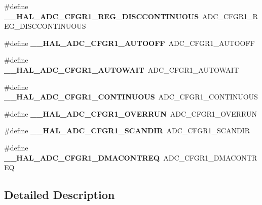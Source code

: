 \begin{DoxyCompactItemize}
\#define {\bfseries \+\_\+\+\_\+\+H\+A\+L\+\_\+\+A\+D\+C\+\_\+\+C\+F\+G\+R1\+\_\+\+R\+E\+G\+\_\+\+D\+I\+S\+C\+C\+O\+N\+T\+I\+N\+U\+O\+US}~A\+D\+C\+\_\+\+C\+F\+G\+R1\+\_\+\+R\+E\+G\+\_\+\+D\+I\+S\+C\+C\+O\+N\+T\+I\+N\+U\+O\+US
\item 
\mbox{\label{group___h_a_l___a_d_c___aliased___macros_gab767937348c3e3b3c22e7316e42004c1}} 
\#define {\bfseries \+\_\+\+\_\+\+H\+A\+L\+\_\+\+A\+D\+C\+\_\+\+C\+F\+G\+R1\+\_\+\+A\+U\+T\+O\+O\+FF}~A\+D\+C\+\_\+\+C\+F\+G\+R1\+\_\+\+A\+U\+T\+O\+O\+FF
\item 
\mbox{\label{group___h_a_l___a_d_c___aliased___macros_ga400e3c69f55dad73669df7ce10297066}} 
\#define {\bfseries \+\_\+\+\_\+\+H\+A\+L\+\_\+\+A\+D\+C\+\_\+\+C\+F\+G\+R1\+\_\+\+A\+U\+T\+O\+W\+A\+IT}~A\+D\+C\+\_\+\+C\+F\+G\+R1\+\_\+\+A\+U\+T\+O\+W\+A\+IT
\item 
\mbox{\label{group___h_a_l___a_d_c___aliased___macros_ga6e3bc5992840ed200085c9b3ba68d7d2}} 
\#define {\bfseries \+\_\+\+\_\+\+H\+A\+L\+\_\+\+A\+D\+C\+\_\+\+C\+F\+G\+R1\+\_\+\+C\+O\+N\+T\+I\+N\+U\+O\+US}~A\+D\+C\+\_\+\+C\+F\+G\+R1\+\_\+\+C\+O\+N\+T\+I\+N\+U\+O\+US
\item 
\mbox{\label{group___h_a_l___a_d_c___aliased___macros_ga60d5ad7e386833338f43e293120fd20a}} 
\#define {\bfseries \+\_\+\+\_\+\+H\+A\+L\+\_\+\+A\+D\+C\+\_\+\+C\+F\+G\+R1\+\_\+\+O\+V\+E\+R\+R\+UN}~A\+D\+C\+\_\+\+C\+F\+G\+R1\+\_\+\+O\+V\+E\+R\+R\+UN
\item 
\mbox{\label{group___h_a_l___a_d_c___aliased___macros_gacadf737dca92c21560405c914f98ab06}} 
\#define {\bfseries \+\_\+\+\_\+\+H\+A\+L\+\_\+\+A\+D\+C\+\_\+\+C\+F\+G\+R1\+\_\+\+S\+C\+A\+N\+D\+IR}~A\+D\+C\+\_\+\+C\+F\+G\+R1\+\_\+\+S\+C\+A\+N\+D\+IR
\item 
\mbox{\label{group___h_a_l___a_d_c___aliased___macros_gad36423da25741a685c5aefd3cd0d08ee}} 
\#define {\bfseries \+\_\+\+\_\+\+H\+A\+L\+\_\+\+A\+D\+C\+\_\+\+C\+F\+G\+R1\+\_\+\+D\+M\+A\+C\+O\+N\+T\+R\+EQ}~A\+D\+C\+\_\+\+C\+F\+G\+R1\+\_\+\+D\+M\+A\+C\+O\+N\+T\+R\+EQ
\end{DoxyCompactItemize}


\subsection{Detailed Description}
